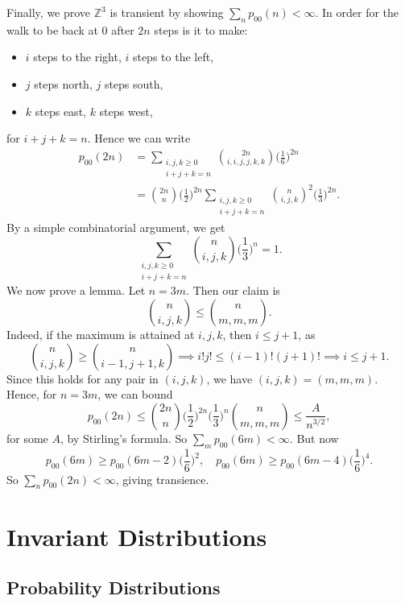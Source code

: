 \documentclass[12pt]{article}
\begin{document}
\begin{proofbox}
Finally, we prove $\mathbb{Z}^3$ is transient by showing $\sum_n p_{00}(n) < \infty$. In order for the walk to be back at $0$ after $2n$ steps is it to make:
\begin{itemize}
	\item $i$ steps to the right, $i$ steps to the left,
	\item $j$ steps north, $j$ steps south,
	\item $k$ steps east, $k$ steps west,
\end{itemize}
for $i+j+k = n$. Hence we can write
\begin{align*}
	p_{00}(2n) &= \sum_{\substack{i, j, k \geq 0 \\ i + j + k = n}} \binom{2n}{i,i,j,j,k,k} \biggl(\frac{1}{6}\biggr)^{2n} \\
		   &= \binom{2n}{n} \biggl( \frac{1}{2} \biggr)^{2n} \sum_{\substack{i, j, k \geq 0 \\i + j + k = n}} \binom{n}{i,j,k}^2 \biggl(\frac{1}{3}\biggr)^{2n}.
\end{align*}
By a simple combinatorial argument, we get
\[
	\sum_{\substack{i, j, k \geq 0 \\i + j + k = n}}\binom{n}{i,j,k} \biggl(\frac{1}{3}\biggr)^{n} = 1
.\]
We now prove a lemma. Let $n = 3m$. Then our claim is
\[
	\binom{n}{i,j,k} \leq \binom{n}{m,m,m}
.\]
Indeed, if the maximum is attained at $i, j, k$, then $i \leq j + 1$, as
\[
	\binom{n}{i,j,k} \geq \binom{n}{i-1,j+1,k} \implies i!j! \leq (i-1)!(j+1)! \implies i \leq j + 1
.\]
Since this holds for any pair in $(i,j,k)$, we have $(i,j,k) = (m,m,m)$. Hence, for $n = 3m$, we can bound
\[
	p_{00}(2n) \leq \binom{2n}{n} \biggl(\frac{1}{2}\biggr)^{2n} \biggl(\frac{1}{3}\biggr)^{n} \binom{n}{m,m,m} \leq \frac{A}{n^{3/2}}
,\]
for some $A$, by Stirling's formula. So $\sum_{m} p_{00}(6m) < \infty$. But now
\[
	p_{00}(6m) \geq p_{00}(6m - 2) \biggl(\frac{1}{6}\biggr)^2, \quad p_{00}(6m) \geq p_{00}(6m - 4) \biggl(\frac{1}{6}\biggr)^{4}
.\]
So $\sum_{n} p_{00}(2n) < \infty$, giving transience.
\end{proofbox}

\newpage

\section{Invariant Distributions}%
\label{sec:invariant_distributions}

\subsection{Probability Distributions}%
\label{sub:probability_distributions}
\end{document}
